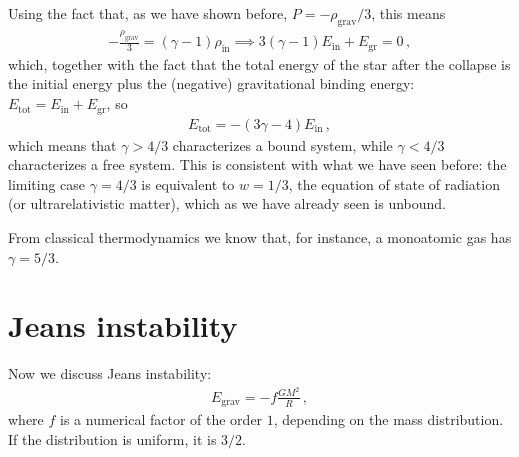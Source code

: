 \documentclass[main.tex]{subfiles}
\begin{document}

Using the fact that, as we have shown before, \(P = - \rho _{\text{grav}} / 3\), this means 
%
\begin{align}
- \frac{\rho _{\text{grav}}}{3} = (\gamma - 1) \rho _{\text{in}} \implies
  3(\gamma -1 ) E _{\text{in}} + E _{\text{gr}} = 0
\,,
\end{align}
%
which, together with the fact that the total energy of the star after the collapse is the initial energy plus the (negative) gravitational binding energy: \(E _{\text{tot}} = E _{\text{in}} + E _{\text{gr}}\), so 
%
\begin{align}
  E _{\text{tot}} = - (3 \gamma - 4) E _{\text{in}}
\,,
\end{align}
%
which means that \(\gamma > 4/3\) characterizes a bound system, while \(\gamma < 4/3\) characterizes a free system. 
This is consistent with what we have seen before: the limiting case \(\gamma = 4/3\) is equivalent to \(w = 1/3\), the equation of state of radiation (or ultrarelativistic matter), which as we have already seen is unbound.

From classical thermodynamics we know that, for instance, a monoatomic gas has \(\gamma = 5 /3\).


\section{Jeans instability}

Now we discuss Jeans instability: 
%
\begin{align}
  E _{\text{grav}} = - f \frac{GM^2}{R}
\,,
\end{align}
%
where \(f\) is a numerical factor of the order \(1\), depending on the mass distribution. If the distribution is uniform, it is \(3/2\).
\end{document}
